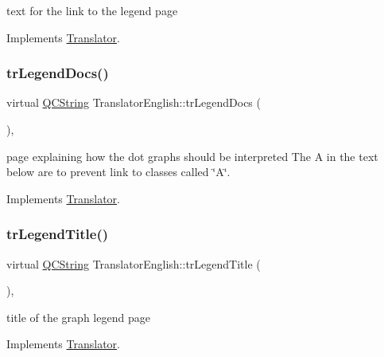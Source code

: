 text for the link to the legend page 

Implements \mbox{\hyperlink{class_translator}{Translator}}.

\mbox{\label{class_translator_english_a68f499bce7c8671fe2b0e8e9bc510b82}} 
\subsubsection{\texorpdfstring{trLegendDocs()}{trLegendDocs()}}
{\footnotesize\ttfamily virtual \mbox{\hyperlink{class_q_c_string}{Q\+C\+String}} Translator\+English\+::tr\+Legend\+Docs (\begin{DoxyParamCaption}{ }\end{DoxyParamCaption})\hspace{0.3cm}{\ttfamily [inline]}, {\ttfamily [virtual]}}

page explaining how the dot graph\textquotesingle{}s should be interpreted The A in the text below are to prevent link to classes called \char`\"{}\+A\char`\"{}. 

Implements \mbox{\hyperlink{class_translator}{Translator}}.

\mbox{\label{class_translator_english_a164cbe72dfb4034a53b1ed76236945c7}} 
\subsubsection{\texorpdfstring{trLegendTitle()}{trLegendTitle()}}
{\footnotesize\ttfamily virtual \mbox{\hyperlink{class_q_c_string}{Q\+C\+String}} Translator\+English\+::tr\+Legend\+Title (\begin{DoxyParamCaption}{ }\end{DoxyParamCaption})\hspace{0.3cm}{\ttfamily [inline]}, {\ttfamily [virtual]}}

title of the graph legend page 

Implements \mbox{\hyperlink{class_translator}{Translator}}.

\mbox{\label{class_translator_english_a208c853d090ef1d496b70a1637533f67}} 
